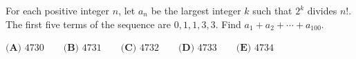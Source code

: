 For each positive integer $n$, let $a_n$ be the largest integer $k$ such that $2^k$ divides $n!$. The first five terms of the sequence are $0,1,1,3,3$. Find $a_1+a_2+\cdots+a_{100}$.

$\textbf{(A) } 4730 \qquad \textbf{(B) } 4731 \qquad \textbf{(C) } 4732 \qquad \textbf{(D) } 4733 \qquad \textbf{(E) } 4734$

